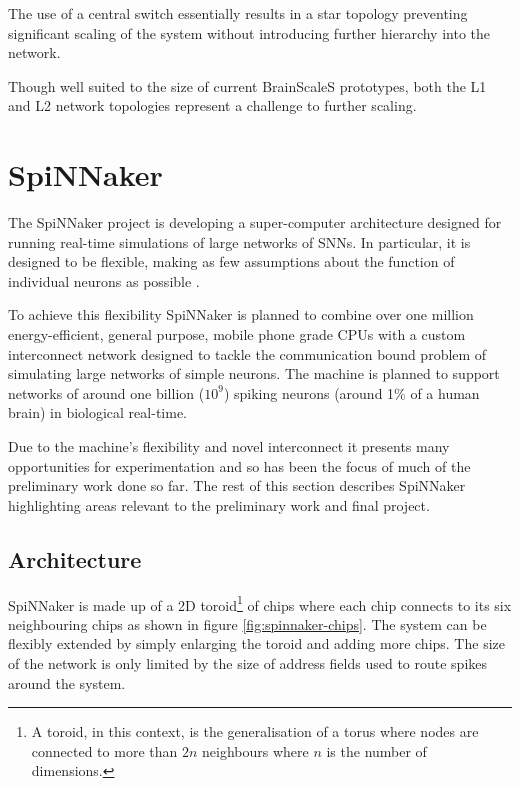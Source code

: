 				The use of a central switch essentially results in a star topology
				preventing significant scaling of the system without introducing further
				hierarchy into the network.
				
				Though well suited to the size of current BrainScaleS prototypes, both
				the L1 and L2 network topologies represent a challenge to further
				scaling.
	
	\section{SpiNNaker}
		
		\label{sec:spinnaker}
		
		
		The SpiNNaker project is developing a super-computer architecture designed
		for running real-time simulations of large networks of SNNs. In particular,
		it is designed to be flexible, making as few assumptions about the function
		of individual neurons as possible \cite{furber06}.
		
		To achieve this flexibility SpiNNaker is planned to combine over one million
		energy-efficient, general purpose, mobile phone grade CPUs with a custom
		interconnect network designed to tackle the communication bound problem of
		simulating large networks of simple neurons. The machine is planned to
		support networks of around one billion ($10^9$) spiking neurons (around 1\%
		of a human brain) in biological real-time.
		
		Due to the machine's flexibility and novel interconnect it presents many
		opportunities for experimentation and so has been the focus of much of the
		preliminary work done so far. The rest of this section describes SpiNNaker
		highlighting areas relevant to the preliminary work and final project.
		
		\subsection{Architecture}
			
			
			SpiNNaker is made up of a 2D toroid\footnote{A toroid, in this context, is
			the generalisation of a torus where nodes are connected to more than $2n$
			neighbours where $n$ is the number of dimensions.} of chips where each
			chip connects to its six neighbouring chips as shown in figure
			\ref{fig:spinnaker-chips}. The system can be flexibly extended by simply
			enlarging the toroid and adding more chips. The size of the network is
			only limited by the size of address fields used to route spikes around the
			system.
			
